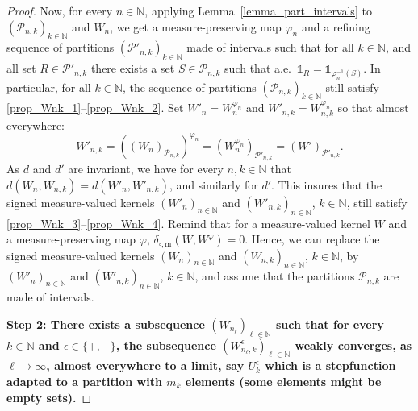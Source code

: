 \documentclass{amsart}
\newcommand{\aE}{a.e.\ }
\theoremstyle{plain}
\theoremstyle{definition}
\newcommand{\cP}{\mathcal{P}}
\newcommand{\m}{\mathrm{m}}
\newcommand{\ddcut}{\delta_{\square,\m}}
\newcommand{\ind}{\mathds{1}}
\newcommand{\N}{\mathbb{N}}
\begin{document}
\begin{proof}
Now, for every $n\in\N$, applying Lemma~\ref{lemma_part_intervals} to 
	$(\cP_{n,k})_{k\in\N}$ and $W_n$,
we get a  measure-preserving map $\varphi_{n}$ and a refining sequence of partitions
$(\cP'_{n,k})_{k\in\N}$ made of intervals such that
for all $k\in\N$, and all set $R\in\cP'_{n,k}$
	there exists a set $S\in\cP_{n,k}$ such that \aE $\ind_{R} = \ind_{\varphi_n^{-1}(S)}$.
In particular, for all $k\in\N$, the sequence of partitions $(\cP_{n,k})_{k\in\N}$
	still satisfy \ref{prop_Wnk_1}--\ref{prop_Wnk_2}.
Set $W'_n = W_n^{\varphi_n}$ and $W'_{n,k}=W_{n,k}^{\varphi_{n}}$ so that
almost everywhere:
\[
W'_{n,k} = \left((W_n)_{\mathcal{P}_{n,k}}\right)^{\varphi_{n}}
=(W_n^{\varphi_{n}})_{\mathcal{P}'_{n,k}}
=(W')_{\mathcal{P}'_{n,k}}.
\]
As $d$ and $d'$ are invariant, we have for every $n,k\in\N$ that
$d(W_n, W_{n,k}) = d(W'_n, W'_{n,k})$, and similarly for $d'$.
This insures that the signed measure-valued kernels $(W'_n)_{n\in\N}$ 
	and $(W'_{n,k})_{n\in\N}$, $k\in\N$,
	still satisfy \ref{prop_Wnk_3}--\ref{prop_Wnk_4}.
Remind that for a measure-valued kernel $W$ and a measure-preserving map $\varphi$,
	$\ddcut(W,W^\varphi)=0$.
Hence, we can replace the signed measure-valued kernels $(W_n)_{n\in\N}$ 
	and $(W_{n,k})_{n\in\N}$, $k\in\N$,
	by $(W'_n)_{n\in\N}$ and $(W'_{n,k})_{n\in\N}$,  $k\in\N$,
	and assume that the partitions $\cP_{n,k}$ are made of intervals.


\medskip

\textbf{Step 2: There exists a subsequence $(W_{n_\ell} )_{\ell\in\N}$ such that 
for every $k\in \N$ and $\epsilon\in\{+,-\}$, 
the subsequence $(W_{n_\ell,k}^\epsilon )_{\ell\in\N}$ weakly converges, 
as $\ell \to\infty$, 
almost everywhere to a limit, say $U_k^\epsilon$ which is a stepfunction adapted
to a partition with $m_k$ elements
(some elements might be empty sets).}



\end{proof}
\end{document}
